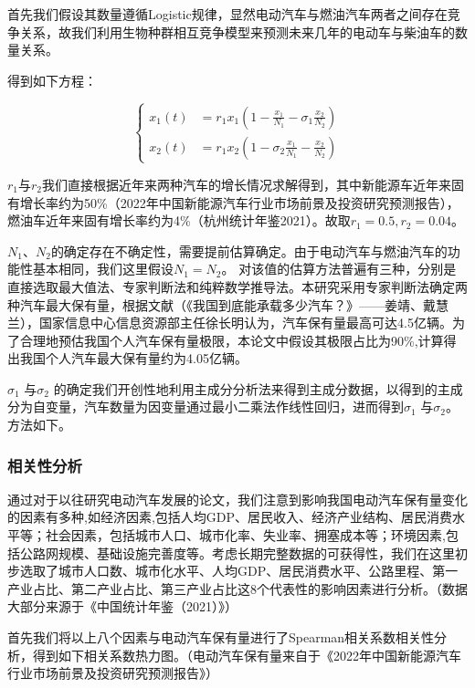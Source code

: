 \documentclass[]{article}
\begin{document}
首先我们假设其数量遵循Logistic规律，显然电动汽车与燃油汽车两者之间存在竞争关系，故我们利用生物种群相互竞争模型来预测未来几年的电动车与柴油车的数量关系。

得到如下方程：

\begin{dmath}
  \left\{
    \begin{aligned}
      x_1(t) & = r_1x_1(1-\frac{x_1}{N_1}-\sigma_1\frac{x_2}{N_2}) \\
      x_2(t) & = r_1x_2(1-\sigma_2\frac{x_1}{N_1}-\frac{x_2}{N_2})
    \end{aligned}
    \right.
\end{dmath}

$r_1$与$r_2$我们直接根据近年来两种汽车的增长情况求解得到，其中新能源车近年来固有增长率约为50\%（2022年中国新能源汽车行业市场前景及投资研究预测报告），燃油车近年来固有增长率约为4\%（杭州统计年鉴2021）。故取$r_1=0.5,r_2=0.04$。

$N_1$、$N_2$的确定存在不确定性，需要提前估算确定。由于电动汽车与燃油汽车的功能性基本相同，我们这里假设$N_1=N_2$。
对该值的估算方法普遍有三种，分别是直接选取最大值法、专家判断法和纯粹数学推导法。本研究采用专家判断法确定两种汽车最大保有量，根据文献（《我国到底能承载多少汽车？》------姜靖、戴慧兰），国家信息中心信息资源部主任徐长明认为，汽车保有量最高可达4.5亿辆。为了合理地预估我国个人汽车保有量极限，本论文中假设其极限占比为90\%,计算得出我国个人汽车最大保有量约为4.05亿辆。

$\sigma_1$ 与$\sigma_2$
的确定我们开创性地利用主成分分析法来得到主成分数据，以得到的主成分为自变量，汽车数量为因变量通过最小二乘法作线性回归，进而得到$\sigma_1$
  与$\sigma_2$。 方法如下。

\subsubsection{相关性分析}

通过对于以往研究电动汽车发展的论文，我们注意到影响我国电动汽车保有量变化的因素有多种,如经济因素,包括人均GDP、居民收入、经济产业结构、居民消费水平等；社会因素，包括城市人口、城市化率、失业率、拥塞成本等；环境因素,包括公路网规模、基础设施完善度等。考虑长期完整数据的可获得性，我们在这里初步选取了城市人口数、城市化水平、人均GDP、居民消费水平、公路里程、第一产业占比、第二产业占比、第三产业占比这8个代表性的影响因素进行分析。（数据大部分来源于《中国统计年鉴（2021）》）

首先我们将以上八个因素与电动汽车保有量进行了Spearman相关系数相关性分析，得到如下相关系数热力图。（电动汽车保有量来自于《2022年中国新能源汽车行业市场前景及投资研究预测报告》）
\end{document}

